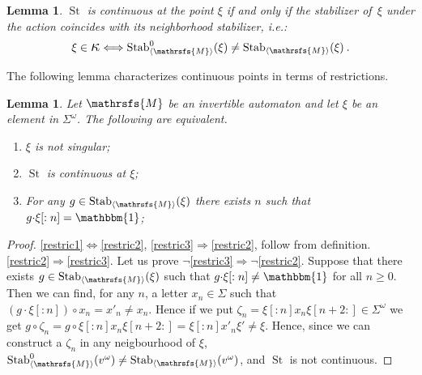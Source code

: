 \documentclass{amsart}
\newtheorem{lemma}[theorem]{Lemma}
\begin{document}
\begin{lemma}\cite[Lemma 5.4]{vorobets}
$\operatorname{St}$ is continuous at the point $\xi$ if and only if the stabilizer of~$\xi$ under the action coincides with its neighborhood stabilizer, \emph{i.e.}: \[\xi \in {\hbox{\Large{$\kappa$}}} \Longleftrightarrow \operatorname{Stab}_{{{\langle}{{\mathrsfs{{{M}}}}}{\rangle}}}^{0}(\xi) \neq \operatorname{Stab}_{{{\langle}{{\mathrsfs{{{M}}}}}{\rangle}}}(\xi)\:. \]
\end{lemma}

The following lemma characterizes continuous points in terms of restrictions. 

\begin{lemma}\label{lemmarestric}
Let ${{{\mathrsfs{{M}}}}}$ be an invertible automaton and let $\xi$ be an element in ${{{\Sigma}}}^{\omega}$.  The following are equivalent.
\begin{enumerate}[label=(\roman{enumi})]
  \item \label{restric1}$\xi$ is not singular;
  \item \label{restric2}$\operatorname{St}$ is continuous at $\xi$;
  \item \label{restric3} For any
    $g\in \operatorname{Stab}_{{{\langle}{{\mathrsfs{{{M}}}}}{\rangle}}}(\xi)$ there exists $n$ such that $g{{{\cdot}}} \xi[:n]=\operatorname{\mathbbm{1}}$;

\end{enumerate}
\end{lemma}
\begin{proof}
\ref{restric1}$\Leftrightarrow$\ref{restric2}, \ref{restric3}$\Rightarrow$\ref{restric2},  follow from definition.\\
\ref{restric2}$\Rightarrow$\ref{restric3}. Let us prove $\neg$\ref{restric3}$\Rightarrow$$\neg$\ref{restric2}. Suppose that there exists  $g \in \operatorname{Stab}_{{{\langle}{{\mathrsfs{{{M}}}}}{\rangle}}}(\xi)$ such that $g {{{\cdot}}} \xi[:n]\neq \operatorname{\mathbbm{1}}$ for all $n \geq 0$. Then we can find, for any $n$, a letter $x_n \in {{{\Sigma}}}$ such that $(g{{{\cdot}}} \xi[:n]){{{\circ}}} x_n = x'_n\neq x_n$. Hence if we put $\zeta_n = \xi[:n]x_n\xi[n+2:]\in {{{\Sigma}}}^{\omega}$ we get $g {{{\circ}}} \zeta_n = g {{{\circ}}} \xi[:n]x_n\xi[n+2:]  = \xi[:n]x'_n\xi' \neq \xi$.  Hence,  since we can construct a $\zeta_n$ in any neigbourhood of $\xi$, $\operatorname{Stab}_{{{\langle}{{\mathrsfs{{{M}}}}}{\rangle}}}^{0}(v^{\omega})\neq \operatorname{Stab}_{{{\langle}{{\mathrsfs{{{M}}}}}{\rangle}}}(v^{\omega})$, and $\operatorname{St}$ is not continuous.
\end{proof}
\end{document}
